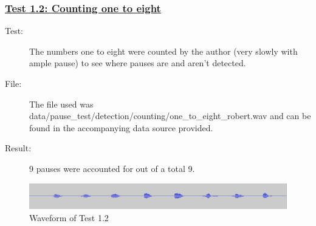\subsubsection{\underline{Test 1.2: Counting one to eight}}
\begin{description}
	\item[Test:] The numbers one to eight were counted by the author (very slowly with ample pause) to see where pauses are and aren't detected.
	\item[File:] The file used was data/pause\_test/detection/counting/one\_to\_eight\_robert.wav and can be found in the accompanying data source provided.
	\item[Result:] 9 pauses were accounted for out of a total 9. 
\end{description}
\begin{figure}[h]
	\center
	\includegraphics[scale=0.2]{src/main-matter/results/preliminary-testing/detection/011}
	\caption{Waveform of Test 1.2}
	\label{fig:011}
\end{figure}
%


